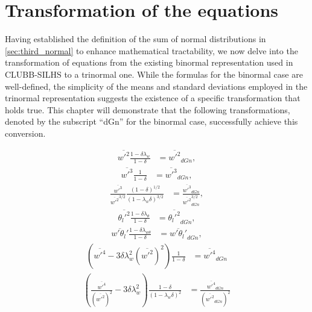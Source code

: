 \section{Transformation of the equations}\label{sec:transformationequations}

Having established the definition of the sum of normal distributions in \cref{sec:third_normal}
to enhance mathematical tractability,
we now delve into the transformation of equations from the existing binormal representation
used in CLUBB-SILHS\cite{larson2022clubbsilhs} to a trinormal one.
While the formulas for the binormal case are well-defined,
the simplicity of the means and standard deviations employed in the trinormal representation suggests
the existence of a specific transformation that holds true.
This chapter will demonstrate that the following transformations,
denoted by the subscript \enquote{dGn} for the binormal case,
successfully achieve this conversion.

\begin{align}
    \overline{w'^2} \frac{1 - \delta\lambda_w}{1 - \delta}
    &= \overline{w'^2}_{dGn}, \label{eq:w_prime_2_transform}
\end{align}
\begin{align}
    \overline{w'^3} \frac{1}{1 - \delta}
    &= \overline{w'^3}_{dGn}, \label{eq:w_prime_3_transform}
\end{align}
\begin{align}
    \frac{\overline{w'^3}}{\overline{w'^2}^{3/2}} \frac{(1 - \delta)^{1/2}}{(1 - \lambda_w\delta)^{3/2}}
    &= \frac{\overline{w'^3}_{dGn}}{\overline{w'^2}_{dGn}^{3/2}}, \label{eq:w_prime_3_div_w_prime_2_transform}
\end{align}
\begin{align}
    \overline{\theta_l'^2} \frac{1 - \delta\lambda_\theta}{1 - \delta}
    &= \overline{\theta_l'^2}_{dGn}, \label{eq:theta_l_prime_transform}
\end{align}
\begin{align}
    \overline{w'\theta_l'} \frac{1 - \delta\lambda_{w\theta}}{1 - \delta}
    &= \overline{w'\theta_l'}_{dGn}, \label{eq:w_prime_theta_l_prime_transform}
\end{align}
\begin{align}
    \left(\overline{w'^4} - 3\delta\lambda_w^2 \left(\overline{w'^2}\right)^2\right) \frac{1}{1 - \delta}
    &= \overline{w'^4}_{dGn} \label{eq:w_prime_4_transform}
\end{align}
\begin{align}
    \left(\frac{\overline{w'^4}}{(\overline{w'^2})^2} - 3\delta\lambda_w^2 \right) \frac{1 - \delta}{(1 - \lambda_w\delta)^2}
    &= \frac{\overline{w'^4}_{dGn}}{(\overline{w'^2}_{dGn})^2} \label{eq:w_prime_4_div_w_prime_2_transform}
\end{align}

